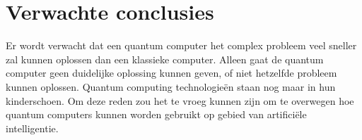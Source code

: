 \section{Verwachte conclusies}
\label{sec:verwachte_conclusies}

Er wordt verwacht dat een quantum computer het complex probleem veel sneller zal kunnen oplossen dan een klassieke computer. Alleen gaat de quantum computer geen duidelijke oplossing kunnen geven, of niet hetzelfde probleem kunnen oplossen. Quantum computing technologieën staan nog maar in hun kinderschoen. Om deze reden zou het te vroeg kunnen zijn om te overwegen hoe quantum computers kunnen worden gebruikt op gebied van artificiële intelligentie. 
    

